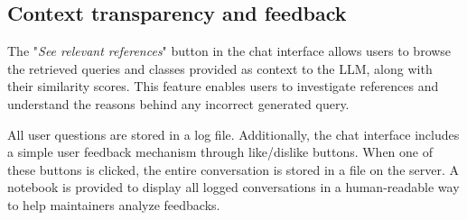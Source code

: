 \documentclass[
]{ceurart}
\begin{document}





\subsection{Context transparency and feedback}

The "\textit{See relevant references}" button in the chat interface allows users to browse the retrieved queries and classes provided as context to the LLM, along with their similarity scores. This feature enables users to investigate references and understand the reasons behind any incorrect generated query.


All user questions are stored in a log file. Additionally, the chat interface includes a simple user feedback mechanism through like/dislike buttons. When one of these buttons is clicked, the entire conversation is stored in a file on the server. A notebook is provided to display all logged conversations in a human-readable way to help maintainers analyze feedbacks.
\end{document}
